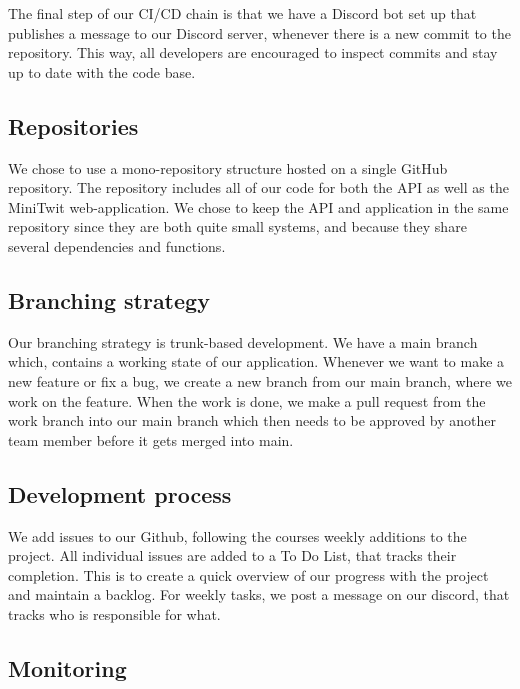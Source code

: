 The final step of our CI/CD chain is that we have a Discord bot set up that publishes a message to our Discord server, whenever there is a new commit to the repository. This way, all developers are encouraged to inspect commits and stay up to date with the code base.

\subsection{Repositories}
We chose to use a mono-repository structure hosted on a single GitHub repository. The repository  includes all of our code for both the API as well as the MiniTwit web-application. 
We chose to keep the API and application in the same repository since they are both quite small systems, and because they share several dependencies and functions.


\subsection{Branching strategy}
Our branching strategy is trunk-based development.
We have a main branch which, contains a working state of our application. Whenever we want to make a new feature or fix a bug, we create a new branch from our main branch, where we work on the feature. When the work is done, we make a pull request from the work branch into our main branch which then needs to be approved by another team member before it gets merged into main.

\subsection{Development process}
We add issues to our Github, following the courses weekly additions to the project. All individual issues are added to a To Do List, that tracks their completion. This is to create a quick overview of our progress with the project and maintain a backlog.
For weekly tasks, we post a message on our discord, that tracks who is responsible for what.


\subsection{Monitoring}\label{Monitoring}

